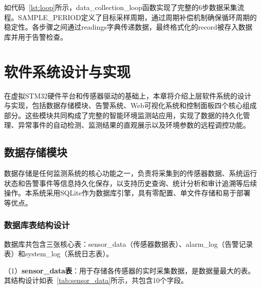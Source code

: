 \documentclass[12pt,a4paper]{ctexart}
\begin{document}
如代码~\ref{lst:loop}所示，data\_collection\_loop函数实现了完整的6步数据采集流程。SAMPLE\_PERIOD定义了目标采样周期，通过周期补偿机制确保循环周期的稳定性。各步骤之间通过readings字典传递数据，最终格式化的record被存入数据库并用于告警检查。



\section{软件系统设计与实现}

在虚拟STM32硬件平台和传感器驱动的基础上，本章将介绍上层软件系统的设计与实现，包括数据存储模块、告警系统、Web可视化系统和控制面板四个核心组成部分。这些模块共同构成了完整的智能环境监测站应用，实现了数据的持久化管理、异常事件的自动检测、监测结果的直观展示以及环境参数的远程调控功能。

\subsection{数据存储模块}

数据存储是任何监测系统的核心功能之一，负责将采集到的传感器数据、系统运行状态和告警事件等信息持久化保存，以支持历史查询、统计分析和审计追溯等后续操作。本系统采用SQLite作为数据库引擎，具有零配置、单文件存储和易于部署等优点。

\subsubsection{数据库表结构设计}

数据库共包含三张核心表：sensor\_data（传感器数据表）、alarm\_log（告警记录表）和system\_log（系统日志表）。

（1）\textbf{sensor\_data表}：用于存储各传感器的实时采集数据，是数据量最大的表。其结构设计如表~\ref{tab:sensor_data}所示，共包含10个字段。
\end{document}
